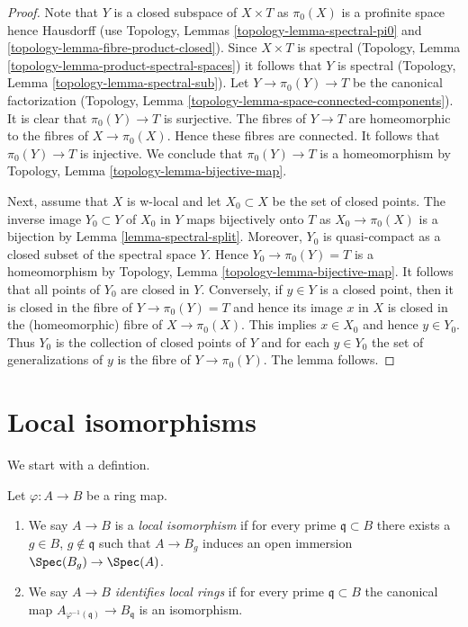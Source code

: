 \begin{proof}
Note that $Y$ is a closed subspace of $X \times T$ as $\pi_0(X)$
is a profinite space hence Hausdorff
(use Topology, Lemmas \ref{topology-lemma-spectral-pi0} and
\ref{topology-lemma-fibre-product-closed}).
Since $X \times T$ is spectral
(Topology, Lemma \ref{topology-lemma-product-spectral-spaces})
it follows that $Y$ is spectral
(Topology, Lemma \ref{topology-lemma-spectral-sub}).
Let $Y \to \pi_0(Y) \to T$ be the canonical factorization
(Topology, Lemma \ref{topology-lemma-space-connected-components}).
It is clear that $\pi_0(Y) \to T$ is surjective.
The fibres of $Y \to T$ are homeomorphic to the fibres of
$X \to \pi_0(X)$. Hence these fibres are connected. It follows
that $\pi_0(Y) \to T$ is injective. We conclude that $\pi_0(Y) \to T$
is a homeomorphism by
Topology, Lemma \ref{topology-lemma-bijective-map}.

\medskip\noindent
Next, assume that $X$ is w-local and let $X_0 \subset X$ be the
set of closed points. The inverse image $Y_0 \subset Y$ of $X_0$ in
$Y$ maps bijectively onto $T$ as $X_0 \to \pi_0(X)$ is a bijection
by Lemma \ref{lemma-spectral-split}. Moreover, $Y_0$ is quasi-compact
as a closed subset of the spectral space $Y$. Hence
$Y_0 \to \pi_0(Y) = T$ is a homeomorphism by
Topology, Lemma \ref{topology-lemma-bijective-map}.
It follows that all points of $Y_0$ are closed in $Y$.
Conversely, if $y \in Y$ is a closed point, then
it is closed in the fibre of $Y \to \pi_0(Y) = T$
and hence its image $x$ in $X$ is closed in the (homeomorphic) fibre of
$X \to \pi_0(X)$. This implies $x \in X_0$ and hence $y \in Y_0$.
Thus $Y_0$ is the collection of closed points of $Y$
and for each $y \in Y_0$ the set of generalizations of $y$ is
the fibre of $Y \to \pi_0(Y)$. The lemma follows.
\end{proof}




\section{Local isomorphisms}
\label{section-local-isomorphism}

\noindent
We start with a defintion.

\begin{definition}
\label{definition-local-isomorphism}
Let $\varphi : A \to B$ be a ring map.
\begin{enumerate}
\item We say $A \to B$ is a {\it local isomorphism} if for every prime
$\mathfrak q \subset B$ there exists a $g \in B$, $g \not \in \mathfrak q$
such that $A \to B_g$ induces an open immersion $\Spec(B_g) \to \Spec(A)$.
\item We say $A \to B$ {\it identifies local rings} if for every prime
$\mathfrak q \subset B$ the canonical map
$A_{\varphi^{-1}(\mathfrak q)} \to B_\mathfrak q$ is an isomorphism.
\end{enumerate}
\end{definition}

